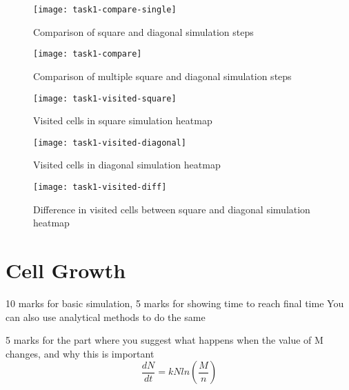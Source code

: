 \begin{figure}[ht]
    \centering
    \texttt{[image: task1-compare-single]}
    \caption[Comparison of square and diagonal simulation steps]{Comparison of square and diagonal simulation steps}
    \label{fig:task1-compare-single}
\end{figure}

\begin{figure}[ht]
    \centering
    \texttt{[image: task1-compare]}
    \caption[Comparison of multiple square and diagonal simulation steps]{Comparison of multiple square and diagonal simulation steps}
    \label{fig:task1-compare}
\end{figure}

\clearpage

\begin{figure}[ht]
    \centering
    \texttt{[image: task1-visited-square]}
    \caption[Visited cells in square simulation heatmap]{Visited cells in square simulation heatmap}
    \label{fig:task1-visited-square}
\end{figure}

\begin{figure}[ht]
    \centering
    \texttt{[image: task1-visited-diagonal]}
    \caption[Visited cells in diagonal simulation heatmap]{Visited cells in diagonal simulation heatmap}
    \label{fig:task1-visited-diagonal}
\end{figure}

\begin{figure}[ht]
    \centering
    \texttt{[image: task1-visited-diff]}
    \caption[Difference in visited cells between square and diagonal simulation heatmap]{Difference in visited cells between square and diagonal simulation heatmap}
    \label{fig:task1-visited-diff}
\end{figure}

\clearpage

\section{Cell Growth}
10 marks for basic simulation, 5 marks for showing time to reach final time 
You can also use analytical methods to do the same

5 marks for the part where you suggest what happens when the value of M changes, and why this is important
\[ \frac{dN}{dt}  = kNln\left(\frac{M}{n} \right) \]

\clearpage

